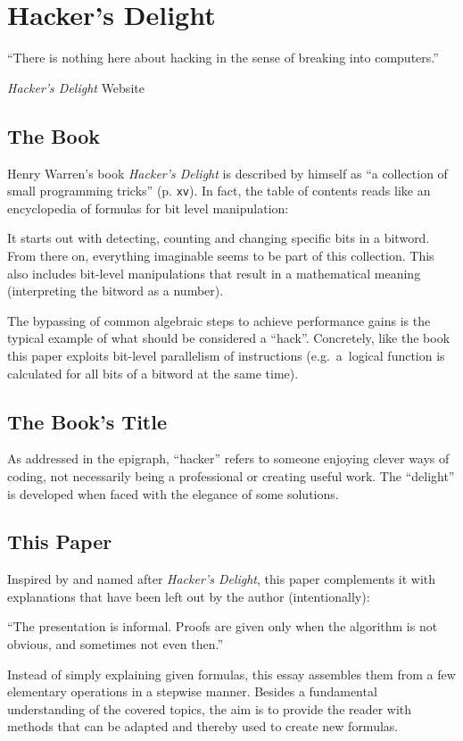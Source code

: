 \section{Hacker's Delight}\label{sec:book}
\epigraph{
``There is nothing here about hacking
in the sense of breaking into computers.''
}{
\emph{Hacker's Delight} Website
\cite{Warren:HD:Website}
}


\subsection*{The Book}
Henry Warren's book \emph{Hacker's Delight}
is described by himself as
``a collection of small programming tricks''
\cite{Warren:2012:HD:2462741} (p. \texttt{xv}).
In fact, the table of contents reads like
an encyclopedia of formulas for bit level manipulation:

It starts out with detecting, counting and changing
specific bits in a bitword.
From there on, everything imaginable seems to be part of this collection.
This also includes bit-level manipulations that result
in a mathematical meaning (interpreting the bitword as a number).

The bypassing of common algebraic steps
to achieve performance gains is the typical example
of what should be considered a ``hack''.
Concretely, like the book this paper exploits
bit-level parallelism of instructions
(e.g.~a~logical function is calculated for all bits of a bitword
at the same time).

\subsection*{The Book's Title}
As addressed in the epigraph, ``hacker'' refers to
someone enjoying clever ways of coding,
not necessarily being a professional
or creating useful work.
The ``delight'' is developed when faced with the elegance of some solutions.


\subsection*{This Paper}
Inspired by and named after \emph{Hacker's Delight},
this paper complements it with explanations
that have been left out by the author (intentionally):

``The presentation is informal.
Proofs are given only when the algorithm is not obvious,
and sometimes not even then.'' \cite{Warren:2012:HD:2462741}

Instead of simply explaining given formulas,
this essay assembles them from a few elementary operations
in a stepwise manner.
Besides a fundamental understanding of the covered topics,
the aim is to provide the reader with methods
that can be adapted and thereby used to create new formulas.
